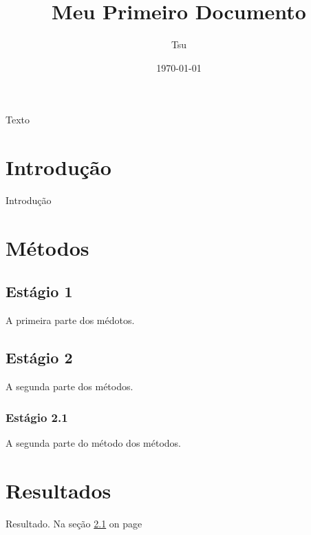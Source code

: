 \documentclass[a4paper,12pt]{article}
\begin{document}
\title{Meu Primeiro Documento}
\author{Tsu}
\date{\today}
\maketitle

Texto

\section{Introdução}
Introdução

\section{Métodos}

\subsection{Estágio 1}
\label{est1}
A primeira parte dos médotos.

\subsection{Estágio 2}
A segunda parte dos métodos.

\subsubsection{Estágio 2.1}
A segunda parte do método dos métodos.

\section{Resultados}
Resultado. Na seção \ref{est1} on page \pageref{est1}
\end{document}
